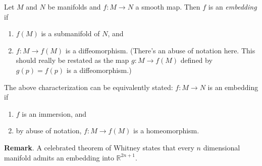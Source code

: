\documentclass[12pt]{article}
\begin{document}

Let $M$ and $N$ be manifolds and $f\colon M\to N$ a smooth map.  Then $f$ is an \emph{embedding} if 
\begin{enumerate}
\item $f(M)$ is a submanifold of $N$, and 
\item $f\colon M\to f(M)$ is a diffeomorphism.  (There's an abuse of notation here.  This should really be restated as the map $g\colon M\to f(M)$ defined by $g(p)=f(p)$ is a diffeomorphism.)
\end{enumerate}

The above characterization can be equivalently stated:
$f\colon M\to N$ is an embedding if
\begin{enumerate}
\item $f$ is an immersion, and 
\item by abuse of notation, $f\colon M\to f(M)$ is a homeomorphism.
\end{enumerate}

\textbf{Remark}.  A celebrated theorem of Whitney states that every $n$ dimensional manifold admits an embedding into $\mathbb{R}^{2n+1}$.
\end{document}
